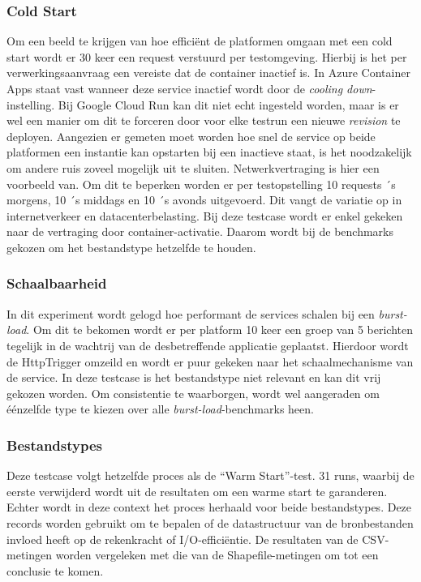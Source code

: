 \subsubsection{Cold Start}

Om een beeld te krijgen van hoe efficiënt de platformen omgaan met een cold start wordt er 30 keer een request verstuurd per testomgeving. Hierbij is het per verwerkingsaanvraag een vereiste dat de container inactief is. In Azure Container Apps staat vast wanneer deze service inactief wordt door de \textit{cooling down}-instelling. Bij Google Cloud Run kan dit niet echt ingesteld worden, maar is er wel een manier om dit te forceren door voor elke testrun een nieuwe \textit{revision} te deployen. Aangezien er  gemeten moet worden hoe snel de service op beide platformen een instantie kan opstarten bij een inactieve staat, is het noodzakelijk om andere ruis zoveel mogelijk uit te sluiten. Netwerkvertraging is hier een voorbeeld van. Om dit te beperken worden er per testopstelling 10 requests ´s morgens, 10 ´s middags en 10 ´s avonds uitgevoerd. Dit vangt de variatie op in internetverkeer en datacenterbelasting. Bij deze testcase wordt er enkel gekeken naar de vertraging door container-activatie. Daarom wordt bij de benchmarks gekozen om het bestandstype hetzelfde te houden.

\subsubsection{Schaalbaarheid}

In dit experiment wordt gelogd hoe performant de services schalen bij een \textit{burst-load}. Om dit te bekomen wordt er per platform 10 keer een groep van 5 berichten tegelijk in de wachtrij van de desbetreffende applicatie geplaatst. Hierdoor wordt de HttpTrigger omzeild en wordt er puur gekeken naar het schaalmechanisme van de service. In deze testcase is het bestandstype niet relevant en kan dit vrij gekozen worden. Om consistentie te waarborgen, wordt wel aangeraden om éénzelfde type te kiezen over alle \textit{burst-load}-benchmarks heen.

\subsubsection{Bestandstypes}

Deze testcase volgt hetzelfde proces als de ``Warm Start''-test. 31 runs, waarbij de eerste verwijderd wordt uit de resultaten om een warme start te garanderen. Echter wordt in deze context het proces herhaald voor beide bestandstypes. Deze records worden gebruikt om te bepalen of de datastructuur van de bronbestanden invloed heeft op de rekenkracht of I/O-efficiëntie. De resultaten van de CSV-metingen worden vergeleken met die van de Shapefile-metingen om tot een conclusie te komen.

